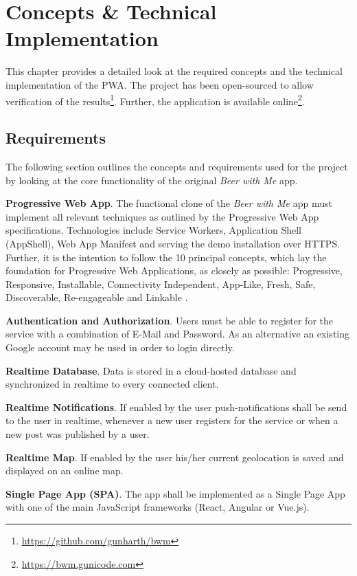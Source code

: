 \chapter{Concepts \& Technical Implementation}
This chapter provides a detailed look at the required concepts and the technical implementation of the PWA. The project has been open-sourced to allow verification of the results\footnote{\url{https://github.com/gunharth/bwm}}. Further, the application is available online\footnote{\url{https://bwm.gunicode.com}}.

\section{Requirements}

The following section outlines the concepts and requirements used for the project by looking at the core functionality of the original \textit{Beer with Me} app.

\textbf{Progressive Web App}. The functional clone of the \textit{Beer with Me} app must implement all relevant techniques as outlined by the Progressive Web App specifications. Technologies include Service Workers, Application Shell (AppShell), Web App Manifest and serving the demo installation over HTTPS. Further, it is the intention to follow the 10 principal concepts, which lay the foundation for Progressive Web Applications, as closely as possible: Progressive, Responsive, Installable, Connectivity Independent, App-Like, Fresh, Safe, Discoverable, Re-engageable and Linkable \citep{osmaniGettingStartedProgressive2015}.

\textbf{Authentication and Authorization}. Users must be able to register for the service with a combination of E-Mail and Password. As an alternative an existing Google account may be used in order to login directly.

\textbf{Realtime Database}. Data is stored in a cloud-hosted database and synchronized in realtime to every connected client.

\textbf{Realtime Notifications}. If enabled by the user push-notifications shall be send to the user in realtime, whenever a new user registers for the service or when a new post was published by a user.

\textbf{Realtime Map}. If enabled by the user his/her current geolocation is saved and displayed on an online map.

\textbf{Single Page App (SPA)}. The app shall be implemented as a Single Page App with one of the main JavaScript frameworks (React, Angular or Vue.js).

